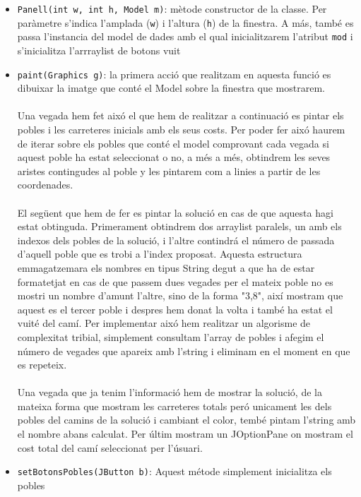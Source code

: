 \documentclass[conference]{IEEEtran}
\begin{document}
\begin{itemize}
    \item \texttt{Panell(int w, int h, Model m)}: mètode constructor de la classe. Per paràmetre s'indica l'amplada (\texttt{w}) i l'altura (\texttt{h}) de la finestra. A más, també es passa l'instancia del model de dades amb el qual inicialitzarem l'atribut \texttt{mod} i s'inicialitza l'arrraylist de botons vuit\\
    \item \texttt{paint(Graphics g)}: la primera acció que realitzam en aquesta funció es dibuixar la imatge que conté el Model sobre la finestra que mostrarem.\\\\
    Una vegada hem fet aixó el que hem de realitzar a continuació es pintar els pobles i les carreteres inicials amb els seus costs. Per poder fer aixó haurem de iterar sobre els pobles que conté el model comprovant cada vegada si aquest poble ha estat seleccionat o no, a més a més, obtindrem les seves aristes contingudes al poble y les pintarem com a linies a partir de les coordenades.\\\\
    El següent que hem de fer es pintar la solució en cas de que aquesta hagi estat obtinguda. Primerament obtindrem dos arraylist paralels, un amb els indexos dels pobles de la solució, i l'altre contindrá el número de passada d'aquell poble que es trobi a l'index proposat. Aquesta estructura emmagatzemara els nombres en tipus String degut a que ha de estar formatetjat en cas de que passem dues vegades per el mateix poble no es mostri un nombre d'amunt l'altre, sino de la forma "3,8", així mostram que aquest es el tercer poble i despres hem donat la volta i també ha estat el vuité del camí. Per implementar aixó hem realitzar un algorisme de complexitat tribial, simplement consultam l'array de pobles i afegim el número de vegades que apareix amb l'string i eliminam en el moment en que es repeteix. \\\\
    Una vegada que ja tenim l'informació hem de mostrar la solució, de la mateixa forma que mostram les carreteres totals peró unicament les dels pobles del camins de la solució i cambiant el color, tembé pintam l'string amb el nombre abans calculat. Per últim mostram un JOptionPane on mostram el cost total del camí seleccionat per l'úsuari.\\
    
    \item \texttt{setBotonsPobles(JButton b)}: Aquest métode simplement inicialitza els pobles
\end{itemize}
\end{document}

